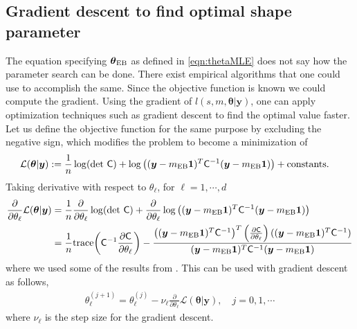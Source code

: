 \documentclass{svjour3}                     %
\newcommand{\bm}[1]{\boldsymbol{#1}}
\newcommand{\trace}[1]{\textup{trace}{#1}}
\newcommand{\vtheta}{{\bm{\theta}}}
\newcommand{\vy}{\bm{y}}
\newcommand{\vone}{\bm{1}}
\newcommand{\mC}{\mathsf{C}}
\newcommand{\mCInv}{\mathsf{C}^{-1}}
\newcommand{\MLE}{\textup{EB}}
\begin{document}
\subsection{Gradient descent to find optimal shape parameter}
\label{grad_descent_MLE}
The equation specifying $\vtheta_\MLE$ as defined in \eqref{eqn:thetaMLE} does not say how the parameter search can be done. There exist empirical algorithms \cite{Bre73, For77} that one could use to accomplish the same.
Since the objective function is known we could compute the gradient.
Using the gradient of $l(s,m,\vtheta | \vy)$, one can apply optimization techniques such as gradient descent to find the optimal value faster. Let us define the objective function for the same purpose by excluding the negative sign, which modifies the problem to become a minimization of
\begin{align*}
\mathcal{L}(\vtheta | \vy)
&:= \frac{1}{n} \log(\det\, \mC) +  \log\left( (\vy-m_\MLE\vone)^T\mCInv(\vy-m_\MLE\vone) \right) + \text{constants.}
\end{align*}
Taking derivative with respect to $\theta_\ell$, for $\ell=1,\cdots,d$
\begin{align*}
\frac{\partial}{\partial \theta_\ell} \mathcal{L}(\vtheta | \vy)
&=  \frac{1}{n} \frac{\partial}{\partial \theta_\ell} \log(\det\, \mC) + \frac{\partial}{\partial \theta_\ell} 
\log\left((\vy-m_\MLE\vone)^T\mCInv(\vy-m_\MLE\vone) \right)
\\
&= \frac 1n \trace{\left( \mCInv \frac{\partial \mC}{\partial \theta_\ell} \right)}
- 
\frac
{\left((\vy-m_\MLE\vone)^T\mCInv\right)^T 
	\left( \frac{\partial \mC}{\partial \theta_\ell} \right)
	((\vy-m_\MLE\vone)^T\mCInv)}
{(\vy-m_\MLE\vone)^T\mCInv(\vy-m_\MLE\vone)}
\end{align*}
where we used some of the results from \cite{Dong2017a}. 
This can be used with gradient descent as follows,
\begin{align}
\label{eqn:deep_descent}
\theta_\ell^{(j+1)} = \theta_\ell^{(j)} - \nu_\ell \frac{\partial}{\partial \theta_\ell} \mathcal{L}(\vtheta | \vy), \quad j=0,1,\cdots
\end{align}
where $\nu_\ell$ is the step size for the gradient descent. 
\end{document}
